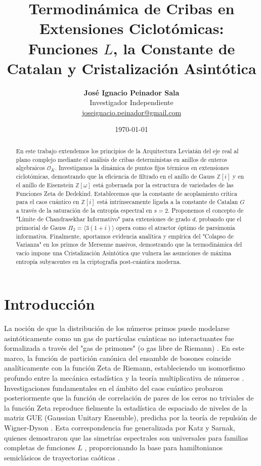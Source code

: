 \documentclass[12pt, a4paper]{article}
\title{\textbf{Termodinámica de Cribas en Extensiones Ciclotómicas: Funciones $L$, la Constante de Catalan y Cristalización Asintótica}}
\author{
  \textbf{José Ignacio Peinador Sala} \\
  \small Investigador Independiente \\
  \small \href{mailto:joseignacio.peinador@gmail.com}{joseignacio.peinador@gmail.com}
}
\date{\today}
\theoremstyle{plain}
\theoremstyle{definition}
\theoremstyle{remark}
\newcommand{\Z}{\mathbb{Z}}
\newcommand{\OK}{\mathcal{O}_K}
\begin{document}
\maketitle

\begin{abstract}
En este trabajo extendemos los principios de la Arquitectura Leviatán del eje real al plano complejo mediante el análisis de cribas deterministas en anillos de enteros algebraicos $\OK$. Investigamos la dinámica de puntos fijos térmicos en extensiones ciclotómicas, demostrando que la eficiencia de filtrado en el anillo de Gauss $\Z[i]$ y en el anillo de Eisenstein $\Z[\omega]$ está gobernada por la estructura de variedades de las Funciones Zeta de Dedekind. Establecemos que la constante de acoplamiento crítica para el caos cuántico en $\Z[i]$ está intrínsecamente ligada a la constante de Catalan $G$ a través de la saturación de la entropía espectral en $s=2$. Proponemos el concepto de "Límite de Chandrasekhar Informativo" para extensiones de grado $d$, probando que el primorial de Gauss $\Pi_2 = \langle 3(1+i) \rangle$ opera como el atractor óptimo de parsimonia informativa. Finalmente, aportamos evidencia analítica y empírica del "Colapso de Varianza" en los primos de Mersenne masivos, demostrando que la termodinámica del vacío impone una Cristalización Asintótica que vulnera las asunciones de máxima entropía subyacentes en la criptografía post-cuántica moderna.
\end{abstract}

\section{Introducción}
\label{sec:intro}

La noción de que la distribución de los números primos puede modelarse asintóticamente como un gas de partículas cuánticas no interactuantes fue formalizada a través del "gas de primones" (o gas libre de Riemann) \cite{Julia1990}. En este marco, la función de partición canónica del ensamble de bosones coincide analíticamente con la función Zeta de Riemann, estableciendo un isomorfismo profundo entre la mecánica estadística y la teoría multiplicativa de números \cite{Spector1990}. Investigaciones fundamentales en el ámbito del caos cuántico probaron posteriormente que la función de correlación de pares de los ceros no triviales de la función Zeta reproduce fielmente la estadística de espaciado de niveles de la matriz GUE (Gaussian Unitary Ensemble), predicha por la teoría de repulsión de Wigner-Dyson \cite{Montgomery1973}. Esta correspondencia fue generalizada por Katz y Sarnak, quienes demostraron que las simetrías espectrales son universales para familias completas de funciones $L$ \cite{KatzSarnak1999}, proporcionando la base para hamiltonianos semiclásicos de trayectorias caóticas \cite{BerryKeating1999}.
\end{document}

